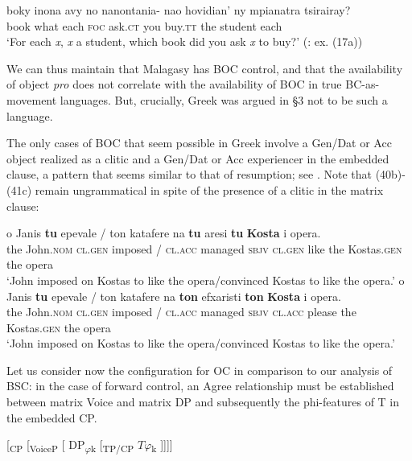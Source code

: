 \documentclass[output=paper]{langsci/langscibook}
\begin{document}
\ea%
    \label{ex:alexiadou:49}
    \gll boky inona avy no nanontania- nao hovidian’ ny mpianatra tsirairay?\\
         book what each \textsc{foc}  ask.\textsc{ct}  you buy.\textsc{tt} the student each\\
    \glt ‘For each \textit{x}, \textit{x} a student, which book did you ask \textit{x} to buy?’ (\citealt{Potsdam2006Backward}: ex. (17a))
    \z

We can thus maintain that Malagasy has BOC control, and that the availability of object \textit{pro} does not correlate with the availability of BOC in true BC-as-movement languages. But, crucially, Greek was argued in §3 not to be such a language.

The only cases of BOC that seem possible in Greek involve a Gen\slash Dat or Acc object realized as a clitic and a Gen\slash Dat or Acc experiencer in the embedded clause, a pattern that seems similar to that of resumption; see . Note that (40b)-(41c) remain ungrammatical in spite of the presence of a clitic in the matrix clause:

\ea%
    \label{ex:alexiadou:50}
    \ea
    \gll o    Janis    \textbf{tu}  epevale / ton katafere   na   \textbf{tu} aresi  \textbf{tu}  \textbf{Kosta}          i opera.\\
                   the John.\textsc{nom}   \textsc{cl.gen}  imposed / \textsc{cl.acc} managed  \textsc{sbjv} \textsc{cl.gen}  like   the Kostas.\textsc{gen} the opera\\
    \glt           ‘John imposed on Kostas to like the opera\slash convinced Kostas to like the opera.’
    \ex
    \gll o    Janis    \textbf{tu}  epevale / ton katafere   na   \textbf{ton} efxaristi  \textbf{ton}  \textbf{Kosta}         i opera.\\
           the John.\textsc{nom} \textsc{cl.gen}  imposed / \textsc{cl.acc} managed  \textsc{sbjv} \textsc{cl.acc}  please the Kostas.\textsc{gen} the opera\\
    \glt   ‘John imposed on Kostas to like the opera\slash convinced Kostas to like the opera.’
    \z
\z

Let us consider now the configuration for OC in comparison to our analysis of BSC: in the case of forward control, an Agree relationship must be established between matrix Voice and matrix DP and subsequently the phi-features of T in the embedded CP.    

\ea%
    \label{ex:alexiadou:51}
    [\textsubscript{CP} [\textsubscript{VoiceP} [ DP\textsubscript{$\varphi $}\textsubscript{k} [\textsubscript{TP/CP}    $T\varphi $\textsubscript{k}    ]]]]
    \z
\end{document}
